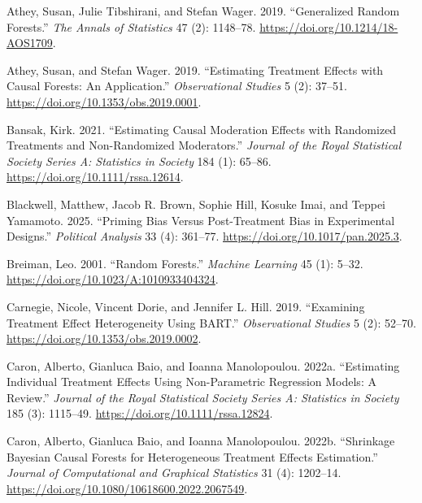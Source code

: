 \documentclass[
  10pt,
  a4paper,
  DIV=11,
  numbers=noendperiod]{scrartcl}
\newlength{\cslhangindent}
\newenvironment{CSLReferences}[2] %
 {\begin{list}{}{%
  \setlength{\itemindent}{0pt}
  \setlength{\leftmargin}{0pt}
  \setlength{\parsep}{0pt}
  \ifodd #1
   \setlength{\leftmargin}{\cslhangindent}
   \setlength{\itemindent}{-1\cslhangindent}
  \fi
  \setlength{\itemsep}{#2\baselineskip}}}
 {\end{list}}
\begin{document}
\protect{}\label{refs}
\begin{CSLReferences}{1}{1}
Athey, Susan, Julie Tibshirani, and Stefan Wager. 2019. {``Generalized
Random Forests.''} \emph{The Annals of Statistics} 47 (2): 1148--78.
\url{https://doi.org/10.1214/18-AOS1709}.

Athey, Susan, and Stefan Wager. 2019. {``Estimating Treatment Effects
with Causal Forests: An Application.''} \emph{Observational Studies} 5
(2): 37--51. \url{https://doi.org/10.1353/obs.2019.0001}.

Bansak, Kirk. 2021. {``Estimating Causal Moderation Effects with
Randomized Treatments and Non-Randomized Moderators.''} \emph{Journal of
the Royal Statistical Society Series A: Statistics in Society} 184 (1):
65--86. \url{https://doi.org/10.1111/rssa.12614}.

Blackwell, Matthew, Jacob R. Brown, Sophie Hill, Kosuke Imai, and Teppei
Yamamoto. 2025. {``Priming Bias Versus Post-Treatment Bias in
Experimental Designs.''} \emph{Political Analysis} 33 (4): 361--77.
\url{https://doi.org/10.1017/pan.2025.3}.

Breiman, Leo. 2001. {``Random Forests.''} \emph{Machine Learning} 45
(1): 5--32. \url{https://doi.org/10.1023/A:1010933404324}.

Carnegie, Nicole, Vincent Dorie, and Jennifer L. Hill. 2019.
{``Examining Treatment Effect Heterogeneity Using BART.''}
\emph{Observational Studies} 5 (2): 52--70.
\url{https://doi.org/10.1353/obs.2019.0002}.

Caron, Alberto, Gianluca Baio, and Ioanna Manolopoulou. 2022a.
{``Estimating Individual Treatment Effects Using Non-Parametric
Regression Models: A Review.''} \emph{Journal of the Royal Statistical
Society Series A: Statistics in Society} 185 (3): 1115--49.
\url{https://doi.org/10.1111/rssa.12824}.

Caron, Alberto, Gianluca Baio, and Ioanna Manolopoulou. 2022b.
{``Shrinkage Bayesian Causal Forests for Heterogeneous Treatment Effects
Estimation.''} \emph{Journal of Computational and Graphical Statistics}
31 (4): 1202--14. \url{https://doi.org/10.1080/10618600.2022.2067549}.


\end{CSLReferences}
\end{document}
